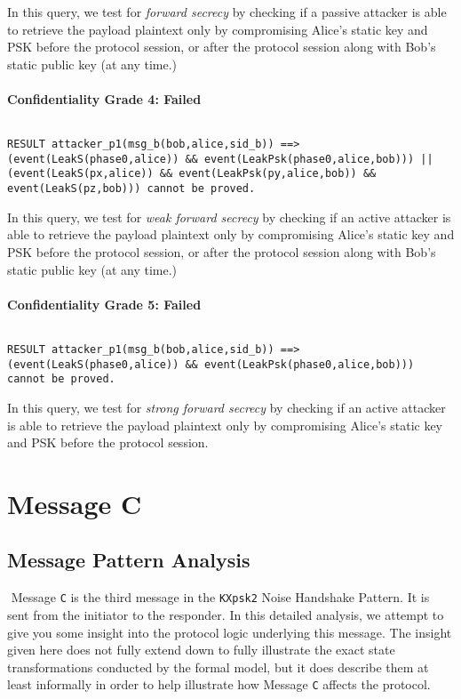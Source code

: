 In this query, we test for \emph{forward secrecy} by checking if a passive attacker is able to retrieve the payload plaintext only by compromising Alice's static key and PSK before the protocol session, or after the protocol session along with Bob's static public key (at any time.)


\paragraph{Confidentiality Grade 4: Failed}$ $
\begin{lstlisting}
RESULT attacker_p1(msg_b(bob,alice,sid_b)) ==> (event(LeakS(phase0,alice)) && event(LeakPsk(phase0,alice,bob))) || (event(LeakS(px,alice)) && event(LeakPsk(py,alice,bob)) && event(LeakS(pz,bob))) cannot be proved.
\end{lstlisting}

In this query, we test for \emph{weak forward secrecy} by checking if an active attacker is able to retrieve the payload plaintext only by compromising Alice's static key and PSK before the protocol session, or after the protocol session along with Bob's static public key (at any time.)


\paragraph{Confidentiality Grade 5: Failed}$ $
\begin{lstlisting}
RESULT attacker_p1(msg_b(bob,alice,sid_b)) ==> (event(LeakS(phase0,alice)) && event(LeakPsk(phase0,alice,bob))) cannot be proved.
\end{lstlisting}

In this query, we test for \emph{strong forward secrecy} by checking if an active attacker is able to retrieve the payload plaintext only by compromising Alice's static key and PSK before the protocol session.


\section{ Message C}

\subsection{Message Pattern Analysis}$ $
Message \texttt{C} is the third message in the \texttt{KXpsk2} Noise Handshake Pattern. It is sent from the initiator to the responder. In this detailed analysis, we attempt to give you some insight into the protocol logic underlying this message. The insight given here does not fully extend down to fully illustrate the exact state transformations conducted by the formal model, but it does describe them at least informally in order to help illustrate how Message \texttt{C} affects the protocol.



